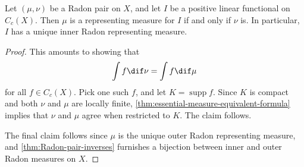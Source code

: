 \documentclass[article, a4paper, 11pt, oneside]{memoir}
\numberwithin{equation}{chapter}
\DeclareMathOperator{\supp}{supp}
\begin{document}
\begin{proposition}
    Let $(\mu,\nu)$ be a Radon pair on $X$, and let $I$ be a positive linear functional on $C_c(X)$. Then $\mu$ is a representing measure for $I$ if and only if $\nu$ is. In particular, $I$ has a unique inner Radon representing measure.
\end{proposition}

\begin{proof}
    This amounts to showing that
    \begin{equation*}
        \int f \dif \nu = \int f \dif \mu
    \end{equation*}
    for all $f \in C_c(X)$. Pick one such $f$, and let $K = \supp f$. Since $K$ is compact and both $\nu$ and $\mu$ are locally finite, \cref{thm:essential-measure-equivalent-formula} implies that $\nu$ and $\mu$ agree when restricted to $K$. The claim follows.

    The final claim follows since $\mu$ is the unique outer Radon representing measure, and \cref{thm:Radon-pair-inverses} furnishes a bijection between inner and outer Radon measures on $X$. %
\end{proof}


\nocite{*}

\printbibliography
\end{document}
